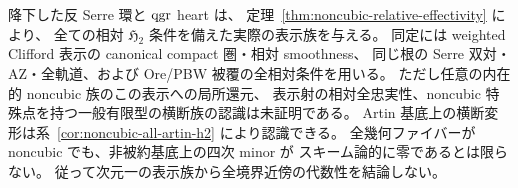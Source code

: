 \begin{remark}[明示表示族と横断認識の区別]
降下した反 Serre 環と $\operatorname{qgr}$ heart は、
定理~\ref{thm:noncubic-relative-effectivity} により、
全ての相対 $\mathfrak H_2$ 条件を備えた実際の表示族を与える。
同定には weighted Clifford 表示の canonical compact 圏・相対 smoothness、
同じ根の Serre 双対・AZ・全軌道、および Ore/PBW 被覆の全相対条件を用いる。
ただし任意の内在的 noncubic 族のこの表示への局所還元、
表示射の相対全忠実性、noncubic 特殊点を持つ一般有限型の横断族の認識は未証明である。
Artin 基底上の横断変形は系~\ref{cor:noncubic-all-artin-h2} により認識できる。
全幾何ファイバーが noncubic でも、非被約基底上の四次 minor が
スキーム論的に零であるとは限らない。
従って次元一の表示族から全境界近傍の代数性を結論しない。
\end{remark}
